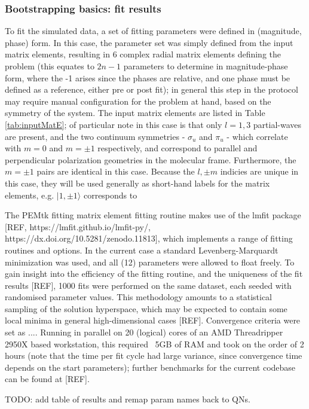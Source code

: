 \subsubsection{Bootstrapping basics: fit results}

To fit the simulated data, a set of fitting parameters were defined in (magnitude, phase) form. In this case, the parameter set was simply defined from the input matrix elements, resulting in 6 complex radial matrix elements defining the problem (this equates to $2n-1$ parameters to determine in magnitude-phase form, where the -1 arises since the phases are relative, and one phase must be defined as a reference, either pre or post fit); in general this step in the protocol may require manual configuration for the problem at hand, based on the symmetry of the system. The input matrix elements are listed in Table \ref{tab:inputMatE}; of particular note in this case is that only $l=1,3$ partial-waves are present, and the two continuum symmetries - $\sigma_u$ and $\pi_u$ - which correlate with $m=0$ and $m=\pm1$ respectively, and correspond to parallel and perpendicular polarization geometries in the molecular frame. Furthermore, the $m=\pm1$ pairs are identical in this case. Because the $l,\pm m$ indicies are unique in this case, they will be used generally as short-hand labels for the matrix elements, e.g. $|1,\pm1\rangle$ corresponds to 

The PEMtk fitting matrix element fitting routine makes use of the lmfit package [REF, https://lmfit.github.io/lmfit-py/, https://dx.doi.org/10.5281/zenodo.11813], which implements a range of fitting routines and options. In the current case a standard Levenberg-Marquardt minimization was used, and all (12) parameters were allowed to float freely. To gain insight into the efficiency of the fitting routine, and the uniqueness of the fit results [REF], 1000 fits were performed on the same dataset, each seeded with randomised parameter values. This methodology amounts to a statistical sampling of the solution hyperspace, which may be expected to contain some local minima in general high-dimensional cases [REF]. Convergence criteria were set as .... Running in parallel on 20 (logical) cores of an AMD Threadripper 2950X based workstation, this required ~5GB of RAM and took on the order of 2 hours (note that the time per fit cycle had large variance, since convergence time depends on the start parameters); further benchmarks for the current codebase can be found at [REF].

TODO: add table of results and remap param names back to QNs.

